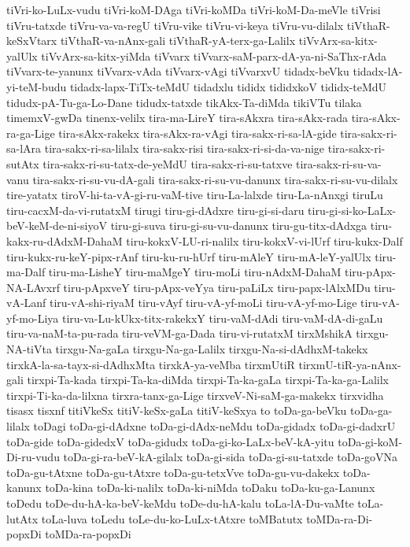 {tiVri-ko-LuLx-vudu
tiVri-koM-DAga
tiVri-koMDa
tiVri-koM-Da-meVle
tiVrisi
tiVru-tatxde
tiVru-va-va-regU
tiVru-vike
tiVru-vi-keya
tiVru-vu-dilalx
tiVthaR-keSxVtarx
tiVthaR-va-nAnx-gali
tiVthaR-yA-terx-ga-Lalilx
tiVvArx-sa-kitx-yalUlx
tiVvArx-sa-kitx-yiMda
tiVvarx
tiVvarx-saM-parx-dA-ya-ni-SaThx-rAda
tiVvarx-te-yanunx
tiVvarx-vAda
tiVvarx-vAgi
tiVvarxvU
tidadx-beVku
tidadx-lA-yi-teM-budu
tidadx-lapx-TiTx-teMdU
tidadxlu
tididx
tididxkoV
tididx-teMdU
tidudx-pA-Tu-ga-Lo-Dane
tidudx-tatxde
tikAkx-Ta-diMda
tikiVTu
tilaka
timemxV-gwDa
tinenx-velilx
tira-ma-LireY
tira-sAkxra
tira-sAkx-rada
tira-sAkx-ra-ga-Lige
tira-sAkx-rakekx
tira-sAkx-ra-vAgi
tira-sakx-ri-sa-lA-gide
tira-sakx-ri-sa-lAra
tira-sakx-ri-sa-lilalx
tira-sakx-risi
tira-sakx-ri-si-da-va-nige
tira-sakx-ri-sutAtx
tira-sakx-ri-su-tatx-de-yeMdU
tira-sakx-ri-su-tatxve
tira-sakx-ri-su-va-vanu
tira-sakx-ri-su-vu-dA-gali
tira-sakx-ri-su-vu-danunx
tira-sakx-ri-su-vu-dilalx
tire-yatatx
tiroV-hi-ta-vA-gi-ru-vaM-tive
tiru-La-lalxde
tiru-La-nAnxgi
tiruLu
tiru-cacxM-da-vi-rutatxM
tirugi
tiru-gi-dAdxre
tiru-gi-si-daru
tiru-gi-si-ko-LaLx-beV-keM-de-ni-siyoV
tiru-gi-suva
tiru-gi-su-vu-danunx
tiru-gu-titx-dAdxga
tiru-kakx-ru-dAdxM-DahaM
tiru-kokxV-LU-ri-nalilx
tiru-kokxV-vi-lUrf
tiru-kukx-Dalf
tiru-kukx-ru-keY-pipx-rAnf
tiru-ku-ru-hUrf
tiru-mAleY
tiru-mA-leY-yalUlx
tiru-ma-Dalf
tiru-ma-LisheY
tiru-maMgeY
tiru-moLi
tiru-nAdxM-DahaM
tiru-pApx-NA-LAvxrf
tiru-pApxveY
tiru-pApx-veYya
tiru-paLiLx
tiru-papx-lAlxMDu
tiru-vA-Lanf
tiru-vA-shi-riyaM
tiru-vAyf
tiru-vA-yf-moLi
tiru-vA-yf-mo-Lige
tiru-vA-yf-mo-Liya
tiru-va-Lu-kUkx-titx-rakekxY
tiru-vaM-dAdi
tiru-vaM-dA-di-gaLu
tiru-va-naM-ta-pu-rada
tiru-veVM-ga-Dada
tiru-vi-rutatxM
tirxMshikA
tirxgu-NA-tiVta
tirxgu-Na-gaLa
tirxgu-Na-ga-Lalilx
tirxgu-Na-si-dAdhxM-takekx
tirxkA-la-sa-tayx-si-dAdhxMta
tirxkA-ya-veMba
tirxmUtiR
tirxmU-tiR-ya-nAnx-gali
tirxpi-Ta-kada
tirxpi-Ta-ka-diMda
tirxpi-Ta-ka-gaLa
tirxpi-Ta-ka-ga-Lalilx
tirxpi-Ti-ka-da-lilxna
tirxra-tanx-ga-Lige
tirxveV-Ni-saM-ga-makekx
tirxvidha
tisasx
tisxnf
titiVkeSx
titiV-keSx-gaLa
titiV-keSxya
to
toDa-ga-beVku
toDa-ga-lilalx
toDagi
toDa-gi-dAdxne
toDa-gi-dAdx-neMdu
toDa-gidadx
toDa-gi-dadxrU
toDa-gide
toDa-gidedxV
toDa-gidudx
toDa-gi-ko-LaLx-beV-kA-yitu
toDa-gi-koM-Di-ru-vudu
toDa-gi-ra-beV-kA-gilalx
toDa-gi-sida
toDa-gi-su-tatxde
toDa-goVNa
toDa-gu-tAtxne
toDa-gu-tAtxre
toDa-gu-tetxVve
toDa-gu-vu-dakekx
toDa-kanunx
toDa-kina
toDa-ki-nalilx
toDa-ki-niMda
toDaku
toDa-ku-ga-Lanunx
toDedu
toDe-du-hA-ka-beV-keMdu
toDe-du-hA-kalu
toLa-lA-Du-vaMte
toLa-lutAtx
toLa-luva
toLedu
toLe-du-ko-LuLx-tAtxre
toMBatutx
toMDa-ra-Di-popxDi
toMDa-ra-popxDi
}
